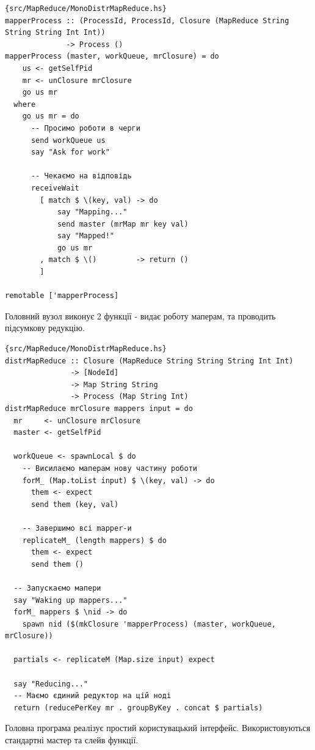 \documentclass[12pt]{article}
\begin{document}
\begin{lstlisting}{src/MapReduce/MonoDistrMapReduce.hs}
mapperProcess :: (ProcessId, ProcessId, Closure (MapReduce String String String Int Int))
              -> Process ()
mapperProcess (master, workQueue, mrClosure) = do
    us <- getSelfPid
    mr <- unClosure mrClosure
    go us mr
  where
    go us mr = do
      -- Просимо роботи в черги
      send workQueue us
      say "Ask for work"

      -- Чекаємо на відповідь
      receiveWait
        [ match $ \(key, val) -> do
            say "Mapping..."
            send master (mrMap mr key val)
            say "Mapped!"
            go us mr
        , match $ \()         -> return ()
        ]

remotable ['mapperProcess]
\end{lstlisting}

Головний вузол виконує 2 функції - видає роботу маперам, та проводить 
підсумкову редукцію.\\

\begin{lstlisting}{src/MapReduce/MonoDistrMapReduce.hs}
distrMapReduce :: Closure (MapReduce String String String Int Int)
               -> [NodeId]
               -> Map String String
               -> Process (Map String Int)
distrMapReduce mrClosure mappers input = do
  mr     <- unClosure mrClosure
  master <- getSelfPid

  workQueue <- spawnLocal $ do
    -- Висилаємо маперам нову частину роботи
    forM_ (Map.toList input) $ \(key, val) -> do
      them <- expect
      send them (key, val)

    -- Завершимо всі mapper-и
    replicateM_ (length mappers) $ do
      them <- expect
      send them ()

  -- Запускаємо мапери
  say "Waking up mappers..."
  forM_ mappers $ \nid -> do
    spawn nid ($(mkClosure 'mapperProcess) (master, workQueue, mrClosure))

  partials <- replicateM (Map.size input) expect

  say "Reducing..."
  -- Маємо єдиний редуктор на цій ноді
  return (reducePerKey mr . groupByKey . concat $ partials)
\end{lstlisting}

Головна програма реалізує простий користувацький інтерфейс.
Використовуються стандартні мастер та слейв функції.
\end{document}
